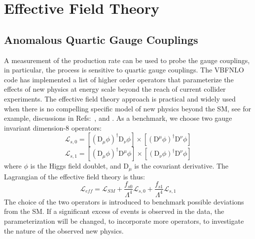 \section{Effective Field Theory}
\subsection{Anomalous Quartic Gauge Couplings}

A measurement
of the production rate can be used to probe the gauge couplings, in
particular, the process is sensitive to quartic gauge couplings. The
{\sc VBFNLO } code has implemented a list of higher order operators
that parameterize the effects of new physics at energy scale beyond
the reach of current collider experiments.  The effective field theory
approach is practical and widely used when there is no compelling
specific model of new physics beyond the SM, see for example,
discussions in Refs:~\cite{Hagiwara:1993ck}, \cite{Buchmuller:1985jz}
and \cite{Eboli:2006wa}.  As a benchmark, we choose two gauge
invariant dimension-8 operators:
\begin{equation}
\mathcal{L}_{s,0} = [(\mathrm{D}_\mu\phi)^\dag\mathrm{D}_\nu \phi]\times [(\mathrm{D}^\mu\phi)^\dag\mathrm{D}^\nu \phi]
\end{equation}
\begin{equation}
\mathcal{L}_{s,1} = [(\mathrm{D}_\mu\phi)^\dag\mathrm{D}^\mu \phi]\times [(\mathrm{D}_\nu\phi)^\dag\mathrm{D}^\nu \phi]
\end{equation}
where $\phi$ is the Higgs field doublet, and $\mathrm{D}_\mu$ is the covariant derivative. 
The Lagrangian of the effective field theory is thus: 
\begin{equation}
\mathcal{L}_{eff} = \mathcal{L}_{SM} + \frac{f_{s0}}{\Lambda^4}\mathcal{L}_{s,0}+\frac{f_{s1}}{\Lambda^4}\mathcal{L}_{s,1}
\end{equation}
The choice of the two operators is introduced to benchmark possible
deviations from the SM. If a significant excess of events is 
observed in the data, the parameterization will be changed, to incorporate 
more operators, to
investigate the nature of the observed new physics.




